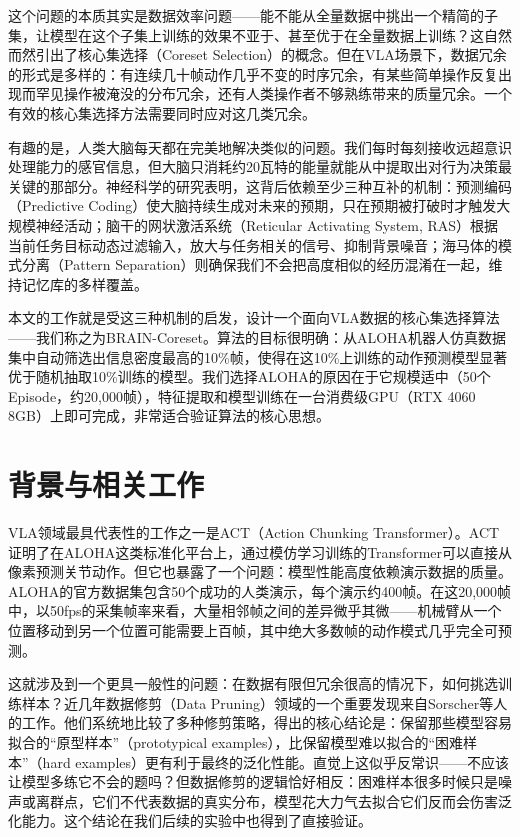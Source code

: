 \documentclass[11pt,a4paper,fontset=none]{ctexart}
\begin{document}
这个问题的本质其实是数据效率问题——能不能从全量数据中挑出一个精简的子集，让模型在这个子集上训练的效果不亚于、甚至优于在全量数据上训练？这自然而然引出了核心集选择（Coreset Selection）的概念。但在VLA场景下，数据冗余的形式是多样的：有连续几十帧动作几乎不变的时序冗余，有某些简单操作反复出现而罕见操作被淹没的分布冗余，还有人类操作者不够熟练带来的质量冗余。一个有效的核心集选择方法需要同时应对这几类冗余。

有趣的是，人类大脑每天都在完美地解决类似的问题。我们每时每刻接收远超意识处理能力的感官信息，但大脑只消耗约20瓦特的能量就能从中提取出对行为决策最关键的那部分。神经科学的研究表明，这背后依赖至少三种互补的机制\cite{millidge2021predictive}：预测编码（Predictive Coding）使大脑持续生成对未来的预期，只在预期被打破时才触发大规模神经活动；脑干的网状激活系统（Reticular Activating System, RAS）根据当前任务目标动态过滤输入，放大与任务相关的信号、抑制背景噪音；海马体的模式分离（Pattern Separation）则确保我们不会把高度相似的经历混淆在一起，维持记忆库的多样覆盖。

本文的工作就是受这三种机制的启发，设计一个面向VLA数据的核心集选择算法——我们称之为BRAIN-Coreset。算法的目标很明确：从ALOHA机器人仿真数据集中自动筛选出信息密度最高的10\%帧，使得在这10\%上训练的动作预测模型显著优于随机抽取10\%训练的模型。我们选择ALOHA的原因在于它规模适中（50个Episode，约20,000帧），特征提取和模型训练在一台消费级GPU（RTX 4060 8GB）上即可完成，非常适合验证算法的核心思想。

\section{背景与相关工作}

VLA领域最具代表性的工作之一是ACT（Action Chunking Transformer）\cite{zhao2023act}。ACT证明了在ALOHA这类标准化平台上，通过模仿学习训练的Transformer可以直接从像素预测关节动作。但它也暴露了一个问题：模型性能高度依赖演示数据的质量。ALOHA的官方数据集包含50个成功的人类演示，每个演示约400帧。在这20,000帧中，以50fps的采集帧率来看，大量相邻帧之间的差异微乎其微——机械臂从一个位置移动到另一个位置可能需要上百帧，其中绝大多数帧的动作模式几乎完全可预测。

这就涉及到一个更具一般性的问题：在数据有限但冗余很高的情况下，如何挑选训练样本？近几年数据修剪（Data Pruning）领域的一个重要发现来自Sorscher等人的工作\cite{sorscher2022beyond}。他们系统地比较了多种修剪策略，得出的核心结论是：保留那些模型容易拟合的“原型样本”（prototypical examples），比保留模型难以拟合的“困难样本”（hard examples）更有利于最终的泛化性能。直觉上这似乎反常识——不应该让模型多练它不会的题吗？但数据修剪的逻辑恰好相反：困难样本很多时候只是噪声或离群点，它们不代表数据的真实分布，模型花大力气去拟合它们反而会伤害泛化能力。这个结论在我们后续的实验中也得到了直接验证。
\end{document}
